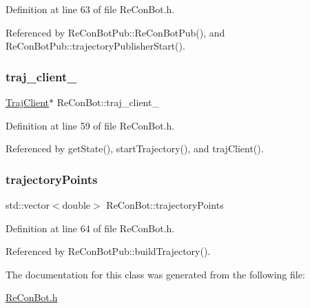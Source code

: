 Definition at line 63 of file Re\+Con\+Bot.\+h.



Referenced by Re\+Con\+Bot\+Pub\+::\+Re\+Con\+Bot\+Pub(), and Re\+Con\+Bot\+Pub\+::trajectory\+Publisher\+Start().

\mbox{\label{class_re_con_bot_a14a35ad6ca284af7db7228d7872720d1}} 
\subsubsection{\texorpdfstring{traj\+\_\+client\+\_\+}{traj\_client\_}}
{\footnotesize\ttfamily \hyperlink{basic__arm_8cpp_a6fb8875093261cdc69e54d3ac7d5c301}{Traj\+Client}$\ast$ Re\+Con\+Bot\+::traj\+\_\+client\+\_\+\hspace{0.3cm}{\ttfamily [protected]}}



Definition at line 59 of file Re\+Con\+Bot.\+h.



Referenced by get\+State(), start\+Trajectory(), and traj\+Client().

\mbox{\label{class_re_con_bot_a7c59e136741800bf0734f659119aa5ee}} 
\subsubsection{\texorpdfstring{trajectory\+Points}{trajectoryPoints}}
{\footnotesize\ttfamily std\+::vector$<$double$>$ Re\+Con\+Bot\+::trajectory\+Points\hspace{0.3cm}{\ttfamily [protected]}}



Definition at line 64 of file Re\+Con\+Bot.\+h.



Referenced by Re\+Con\+Bot\+Pub\+::build\+Trajectory().



The documentation for this class was generated from the following file\+:\begin{DoxyCompactItemize}
\item 
\hyperlink{_re_con_bot_8h}{Re\+Con\+Bot.\+h}\end{DoxyCompactItemize}
